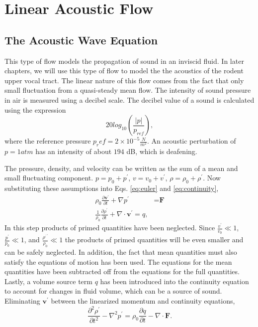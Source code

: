 \documentclass[12pt, letter]{report}
\begin{document}
\section{Linear Acoustic Flow}
\subsection{The Acoustic Wave Equation}
This type of flow models the propagation of sound in an inviscid fluid. In later chapters, we will use this type of flow to model the the acoustics of the rodent upper vocal tract. The linear nature of this flow comes from the fact that only small fluctuation from a quasi-steady mean flow. The intensity of sound pressure in air is measured using a decibel scale. The decibel value of a sound is calculated using the expression
\begin{equation}
20 log_{10} \left( \frac{|p|}{p_{ref}} \right),
\end{equation}
where the reference pressure $p_ref=2 \times 10^{-5} \frac{N}{m^2}$. An acoustic perturbation of $p=1 atm$ has an intensity of about $194$ dB, which is deafening. 

The pressure, density, and velocity can be written as the sum of a mean and small fluctuating component. $p=p_0 + p^{'}$, $v=v_0 + v^{'}$, $\rho=\rho_0 + \rho^{'}$. Now substituting these assumptions into Eqs. \ref{eq:euler} and \ref{eq:continuity},
\begin{equation}
\label{eq:linear1}
\begin{split}
\rho_0 \frac{\partial \textbf{v}^{'}}{\partial t} + \nabla p^{'} &= \textbf{F} \\
\frac{1}{\rho_0}\frac{\partial \rho^{'}}{\partial t} + \nabla \cdot \textbf{v}^{'} = q,
\end{split}
\end{equation}
In this step products of primed quantities have been neglected. Since $\frac{v^{'}}{v_0} \ll 1$, $\frac{p^{'}}{p_0} \ll 1$, and $\frac{\rho^{;'}}{\rho_0} \ll 1$ the products of primed quantities will be even smaller and can be safely neglected. In addition, the fact that mean quantities must also satisfy the equations of motion has been used. The equations for the mean quantities have been subtracted off from the equations for the full quantities. Lastly, a volume source term $q$ has been introduced into the continuity equation to account for changes in fluid volume, which can be a source of sound. Eliminating $\textbf{v}^{'}$ between the linearized momentum and continuity equations,
\begin{equation}
\label{eq:linear2}
\frac{\partial^2 \rho^{'}}{\partial t^2} - \nabla^2 p^{'} = \rho_0 \frac{\partial q}{\partial t} - \nabla \cdot \textbf{F}.
\end{equation}
\end{document}
